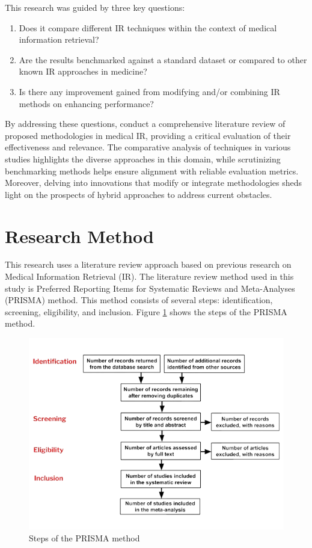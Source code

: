 \documentclass[conference]{IEEEtran}
\begin{document}
This research was guided by three key questions: 
\begin{enumerate}
    \item Does it compare different IR techniques within the context of medical information retrieval?
    \item Are the results benchmarked against a standard dataset or compared to other known IR approaches in medicine?
    \item Is there any improvement gained from modifying and/or combining IR methods on enhancing performance?
\end{enumerate}

By addressing these questions, conduct a comprehensive literature review of proposed methodologies in medical IR, providing a critical evaluation of their effectiveness and relevance. The comparative analysis of techniques in various studies highlights the diverse approaches in this domain, while scrutinizing benchmarking methods helps ensure alignment with reliable evaluation metrics. Moreover, delving into innovations that modify or integrate methodologies sheds light on the prospects of hybrid approaches to address current obstacles.

\section{Research Method}

This research uses a literature review approach based on previous research on Medical Information Retrieval (IR). The literature review method used in this study is Preferred Reporting Items for Systematic Reviews and Meta-Analyses (PRISMA) method. This method consists of several steps: identification, screening, eligibility, and inclusion. Figure \ref{fig:PRISMA} shows the steps of the PRISMA method.

\begin{figure}[ht!]
    \centering
    \includegraphics[scale=.4]{PRISMA.png}
    \caption{Steps of the PRISMA method}
    \label{fig:PRISMA}
\end{figure}
\end{document}

